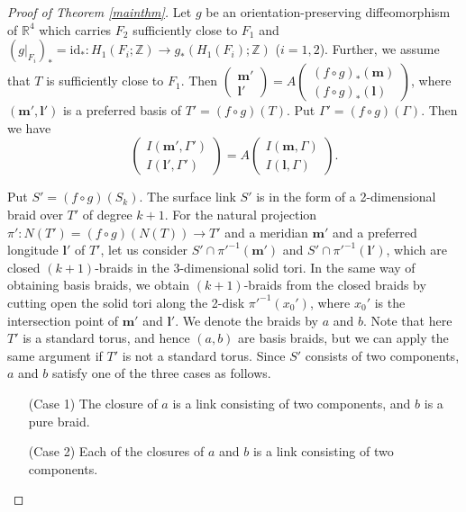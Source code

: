 \documentclass[a4paper,11pt]{amsart}
\numberwithin{equation}{section}
\begin{document}
\begin{proof}[Proof of Theorem \ref{mainthm}]
\begin{sloppypar}
Let $g$ be an orientation-preserving diffeomorphism of $\mathbb{R}^4$ which carries $F_2$ sufficiently close to $F_1$ and $(g|_{F_i})_*=\mathrm{id}_*: H_1(F_i; \mathbb{Z}) \to g_*(H_1(F_i); \mathbb{Z})$ ($i=1,2$). 
Further, we assume that $T$ is sufficiently close to $F_1$. Then $\begin{pmatrix}\mathbf{m}'\\ \mathbf{l}'\end{pmatrix}=A\begin{pmatrix}(f\circ g)_*(\mathbf{m})\\ (f\circ g)_*(\mathbf{l})\end{pmatrix}$, where $(\mathbf{m}', \mathbf{l}')$ is a preferred basis of $T'=(f\circ g)(T)$. 
Put $\Gamma'=(f\circ g) (\Gamma)$. Then we have 
\begin{equation}\label{0323-3}
\begin{pmatrix}I(\mathbf{m}', \Gamma')\\ I(\mathbf{l}', \Gamma')\end{pmatrix}=A\begin{pmatrix}I(\mathbf{m}, \Gamma)\\ I(\mathbf{l}, \Gamma)\end{pmatrix}.
\end{equation}

Put $S'=(f\circ g)(S_k)$. 
The surface link $S'$ is in the form of a 2-dimensional braid over $T'$ of degree $k+1$. 
For the natural projection $\pi': N(T')=(f \circ g)(N(T)) \to T'$ and a meridian $\mathbf{m}'$ and a preferred longitude $\mathbf{l}'$ of $T'$, let us consider $S' \cap \pi'^{-1}(\mathbf{m}')$ and $S' \cap \pi'^{-1}(\mathbf{l}')$, which are closed $(k+1)$-braids in the 3-dimensional solid tori. In the same way of obtaining basis braids, we obtain $(k+1)$-braids from the closed braids by cutting open the solid tori along the 2-disk $\pi'^{-1}(x_0')$, where $x_0'$ is the intersection point of $\mathbf{m}'$ and $\mathbf{l}'$. We denote the braids by $a$ and $b$. Note that here $T'$ is a standard torus, and hence $(a,b)$ are basis braids, but we can apply the same argument if $T'$ is not a standard torus. 
Since $S'$ consists of two components, $a$ and $b$ satisfy one of the three cases as follows.

\begin{enumerate}
\item[(Case 1)] 
The closure of $a$ is a link consisting of two components, and $b$ is a pure braid. 

\item[(Case 2)]
 Each of the closures of $a$ and $b$ is a link consisting of two components. 


\end{enumerate}
\end{sloppypar}
\end{proof}
\end{document}
